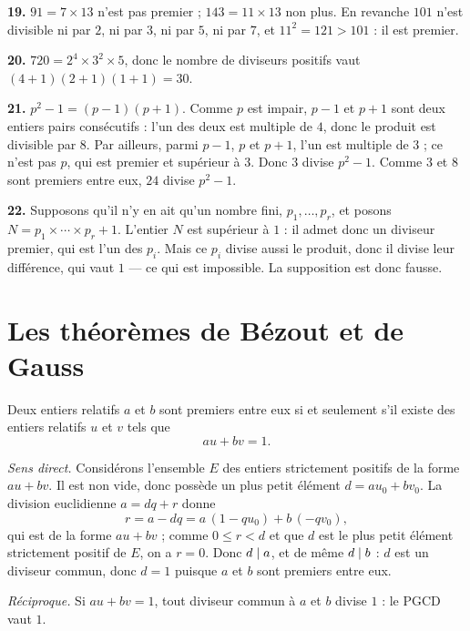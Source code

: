 \begin{corrige}
\textbf{19.} $91 = 7\times13$ n'est pas premier ; $143 = 11\times13$ non plus.
En revanche $101$ n'est divisible ni par $2$, ni par $3$, ni par $5$, ni par
$7$, et $11^{2} = 121 > 101$ : il est premier.

\textbf{20.} $720 = 2^{4}\times3^{2}\times5$, donc le nombre de diviseurs
positifs vaut $(4+1)(2+1)(1+1) = 30$.

\textbf{21.} $p^{2}-1 = (p-1)(p+1)$. Comme $p$ est impair, $p-1$ et $p+1$ sont
deux entiers pairs consécutifs : l'un des deux est multiple de $4$, donc le
produit est divisible par $8$. Par ailleurs, parmi $p-1$, $p$ et $p+1$, l'un
est multiple de $3$ ; ce n'est pas $p$, qui est premier et supérieur à $3$.
Donc $3$ divise $p^{2}-1$. Comme $3$ et $8$ sont premiers entre eux, $24$
divise $p^{2}-1$.

\textbf{22.} Supposons qu'il n'y en ait qu'un nombre fini,
$p_{1},\dots,p_{r}$, et posons $N = p_{1}\times\cdots\times p_{r}+1$. L'entier
$N$ est supérieur à $1$ : il admet donc un diviseur premier, qui est l'un des
$p_{i}$. Mais ce $p_{i}$ divise aussi le produit, donc il divise leur
différence, qui vaut $1$ — ce qui est impossible. La supposition est donc
fausse.
\end{corrige}

\section{Les théorèmes de Bézout et de Gauss}

\begin{theoreme}
Deux entiers relatifs $a$ et $b$ sont premiers entre eux si et seulement s'il
existe des entiers relatifs $u$ et $v$ tels que
\[
  au+bv = 1 .
\]
\end{theoreme}

\begin{demonstration}
\emph{Sens direct.} Considérons l'ensemble $E$ des entiers strictement
positifs de la forme $au+bv$. Il est non vide, donc possède un plus petit
élément $d = au_{0}+bv_{0}$. La division euclidienne $a = dq+r$ donne
\[
  r = a-dq = a\,(1-qu_{0})+b\,(-qv_{0}),
\]
qui est de la forme $au+bv$ ; comme $0 \leq r < d$ et que $d$ est le plus
petit élément strictement positif de $E$, on a $r = 0$. Donc $d \mid a$, et
de même $d \mid b$ : $d$ est un diviseur commun, donc $d = 1$ puisque $a$ et
$b$ sont premiers entre eux.

\smallskip
\emph{Réciproque.} Si $au+bv = 1$, tout diviseur commun à $a$ et $b$ divise
$1$ : le PGCD vaut $1$.
\end{demonstration}

